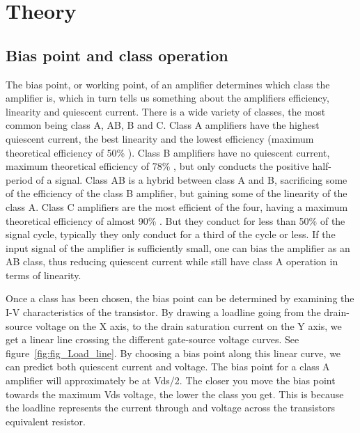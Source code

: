\chapter{Theory}

\section{Bias point and class operation}
The bias point, or working point, of an amplifier determines which class the amplifier is, which in turn tells us something about the amplifiers efficiency, linearity and quiescent current. There is a wide variety of classes, the most common being class A, AB, B and C. 
Class A amplifiers have the highest quiescent current, the best linearity and the lowest efficiency (maximum theoretical efficiency of 50\% ). 
Class B amplifiers have no quiescent current, maximum theoretical efficiency of 78\% , but only conducts the positive half-period of a signal. 
Class AB is a hybrid between class A and B, sacrificing some of the efficiency of the class B amplifier, but gaining some of the linearity of the class A. 
Class C amplifiers are the most efficient of the four, having a maximum theoretical efficiency of almost 90\% . But they conduct for less than 50\%  of the signal cycle, typically they only conduct for a third of the cycle or less.
If the input signal of the amplifier is sufficiently small, one can bias the amplifier as an AB class, thus reducing quiescent current while still have class A operation in terms of linearity.

Once a class has been chosen, the bias point can be determined by examining the I-V characteristics of the transistor. By drawing a loadline going from the drain-source voltage on the X axis, to the drain saturation current on the Y axis, we get a linear line crossing the different gate-source voltage curves. See figure~\ref{fig:fig_Load_line}. By choosing a bias point along this linear curve, we can predict both quiescent current and voltage. The bias point for a class A amplifier will approximately be at Vds/2. The closer you move the bias point towards the maximum Vds voltage, the lower the class you get. This is because the loadline represents the current through and voltage across the transistors equivalent resistor.

